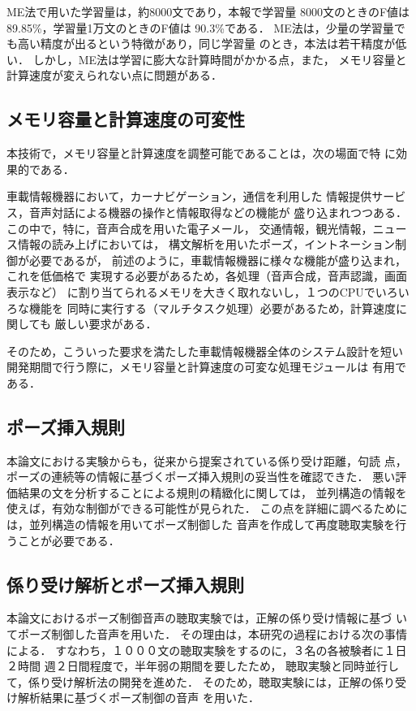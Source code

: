    ME法で用いた学習量は，約8000文であり，本報で学習量 8000文のときのF値は
   89.85\%，学習量1万文のときのF値は 90.3\%である．
   ME法は，少量の学習量でも高い精度が出るという特徴があり，同じ学習量
   のとき，本法は若干精度が低い．
   しかし，ME法は学習に膨大な計算時間がかかる点，また，
   メモリ容量と計算速度が変えられない点に問題がある．

\subsection{メモリ容量と計算速度の可変性}

   本技術で，メモリ容量と計算速度を調整可能であることは，次の場面で特
   に効果的である．

        車載情報機器において，カーナビゲーション，通信を利用した
	情報提供サービス，音声対話による機器の操作と情報取得などの機能が
	盛り込まれつつある．この中で，特に，音声合成を用いた電子メール，
	交通情報，観光情報，ニュース情報の読み上げにおいては，
	構文解析を用いたポーズ，イントネーション制御が必要であるが，
	前述のように，車載情報機器に様々な機能が盛り込まれ，これを低価格で
	実現する必要があるため，各処理（音声合成，音声認識，画面表示など）
	に割り当てられるメモリを大きく取れないし，１つのCPUでいろいろな機能を
	同時に実行する（マルチタスク処理）必要があるため，計算速度に関しても
	厳しい要求がある．
	
	そのため，こういった要求を満たした車載情報機器全体のシステム設計を短い
	開発期間で行う際に，メモリ容量と計算速度の可変な処理モジュールは
	有用である．

\subsection{ポーズ挿入規則}

   本論文における実験からも，従来から提案されている係り受け距離，句読
   点，ポーズの連続等の情報に基づくポーズ挿入規則の妥当性を確認できた．
   悪い評価結果の文を分析することによる規則の精緻化に関しては，
   並列構造の情報を使えば，有効な制御ができる可能性が見られた．
   この点を詳細に調べるためには，並列構造の情報を用いてポーズ制御した
   音声を作成して再度聴取実験を行うことが必要である．   

\subsection{係り受け解析とポーズ挿入規則}

   本論文におけるポーズ制御音声の聴取実験では，正解の係り受け情報に基づ
   いてポーズ制御した音声を用いた．
   その理由は，本研究の過程における次の事情による．
   すなわち，１０００文の聴取実験をするのに，３名の各被験者に１日２時間
   週２日間程度で，半年弱の期間を要したため，
   聴取実験と同時並行して，係り受け解析法の開発を進めた．
   そのため，聴取実験には，正解の係り受け解析結果に基づくポーズ制御の音声
   を用いた．

